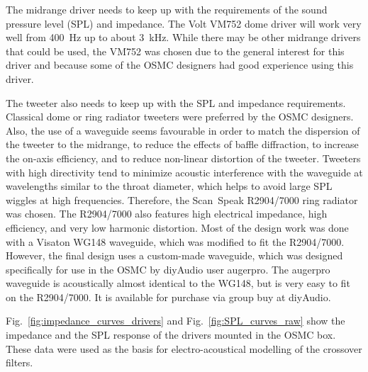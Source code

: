 \documentclass[12pt,a4paper]{article}
\providecommand{\figr}[1]{Fig.~\ref{fig:#1}}
\begin{document}
The midrange driver needs to keep up with the requirements of the sound pressure level (SPL) and impedance. The Volt VM752 dome driver will work very well from \SI{400}{Hz} up to about \SI{3}{kHz}. While there may be other midrange drivers that could be used, the VM752 was chosen due to the general interest for this driver and because some of the OSMC designers had good experience using this driver.

The tweeter also needs to keep up with the SPL and impedance requirements. Classical dome or ring radiator tweeters were preferred by the OSMC designers. Also, the use of a waveguide seems favourable in order to match the dispersion of the tweeter to the midrange, to reduce the effects of baffle diffraction, to increase the on-axis efficiency, and to reduce non-linear distortion of the tweeter. Tweeters with high directivity tend to minimize acoustic interference with the waveguide at wavelengths similar to the throat diameter, which helps to avoid large SPL wiggles at high frequencies\cite{ringradiators_in_waveguides}. Therefore, the Scan~Speak R2904/7000 ring radiator was chosen. The R2904/7000 also features high electrical impedance, high efficiency, and very low harmonic distortion. Most of the design work was done with a Visaton WG148 waveguide, which was modified to fit the R2904/7000.\cite{WG148mod} However, the final design uses a custom-made waveguide, which was designed specifically for use in the OSMC by diyAudio user augerpro\cite{augerproWGcircular}. The augerpro waveguide is acoustically almost identical to the WG148\cite{osmc_p881}, but is very easy to fit on the R2904/7000. It is available for purchase via group buy at diyAudio.\cite{augerpro_groupbuy}

\figr{impedance_curves_drivers} and \figr{SPL_curves_raw} show the impedance and the SPL response of the drivers mounted in the OSMC box. These data were used as the basis for electro-acoustical modelling of the crossover filters.
\end{document}
